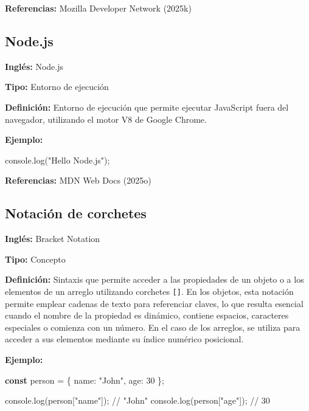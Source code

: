 \documentclass[
  letterpaper,
  DIV=11,
  numbers=noendperiod]{scrreprt}
\newenvironment{Shaded}{\begin{snugshade}}{\end{snugshade}}
\newcommand{\BuiltInTok}[1]{\textcolor[rgb]{0.00,0.23,0.31}{#1}}
\newcommand{\CommentTok}[1]{\textcolor[rgb]{0.37,0.37,0.37}{#1}}
\newcommand{\DataTypeTok}[1]{\textcolor[rgb]{0.68,0.00,0.00}{#1}}
\newcommand{\DecValTok}[1]{\textcolor[rgb]{0.68,0.00,0.00}{#1}}
\newcommand{\FunctionTok}[1]{\textcolor[rgb]{0.28,0.35,0.67}{#1}}
\newcommand{\KeywordTok}[1]{\textcolor[rgb]{0.00,0.23,0.31}{\textbf{#1}}}
\newcommand{\NormalTok}[1]{\textcolor[rgb]{0.00,0.23,0.31}{#1}}
\newcommand{\OperatorTok}[1]{\textcolor[rgb]{0.37,0.37,0.37}{#1}}
\newcommand{\StringTok}[1]{\textcolor[rgb]{0.13,0.47,0.30}{#1}}
\let\oldsubsection\subsection
\renewcommand{\subsection}{\phantomsection\oldsubsection}
\begin{document}
\textbf{Referencias:} Mozilla Developer Network (2025k)

\subsection*{Node.js}\label{glos-nodejs}

\textbf{Inglés:} Node.js

\textbf{Tipo:} Entorno de ejecución

\textbf{Definición:} Entorno de ejecución que permite ejecutar
JavaScript fuera del navegador, utilizando el motor V8 de Google Chrome.

\textbf{Ejemplo:}

\begin{Shaded}
\begin{Highlighting}[]
\BuiltInTok{console}\OperatorTok{.}\FunctionTok{log}\NormalTok{(}\StringTok{"Hello Node.js"}\NormalTok{)}\OperatorTok{;}
\end{Highlighting}
\end{Shaded}

\textbf{Referencias:} MDN Web Docs (2025o)

\subsection*{Notación de corchetes}\label{glos-notacion_corchetes}

\textbf{Inglés:} Bracket Notation

\textbf{Tipo:} Concepto

\textbf{Definición:} Sintaxis que permite acceder a las propiedades de
un objeto o a los elementos de un arreglo utilizando corchetes
\texttt{{[}{]}}. En los objetos, esta notación permite emplear cadenas
de texto para referenciar claves, lo que resulta esencial cuando el
nombre de la propiedad es dinámico, contiene espacios, caracteres
especiales o comienza con un número. En el caso de los arreglos, se
utiliza para acceder a sus elementos mediante su índice numérico
posicional.

\textbf{Ejemplo:}

\begin{Shaded}
\begin{Highlighting}[]
\KeywordTok{const}\NormalTok{ person }\OperatorTok{=}\NormalTok{ \{}
  \DataTypeTok{name}\OperatorTok{:} \StringTok{"John"}\OperatorTok{,}
  \DataTypeTok{age}\OperatorTok{:} \DecValTok{30}
\NormalTok{\}}\OperatorTok{;}

\BuiltInTok{console}\OperatorTok{.}\FunctionTok{log}\NormalTok{(person[}\StringTok{"name"}\NormalTok{])}\OperatorTok{;} \CommentTok{// "John"}
\BuiltInTok{console}\OperatorTok{.}\FunctionTok{log}\NormalTok{(person[}\StringTok{"age"}\NormalTok{])}\OperatorTok{;} \CommentTok{// 30}
\end{Highlighting}
\end{Shaded}
\end{document}
